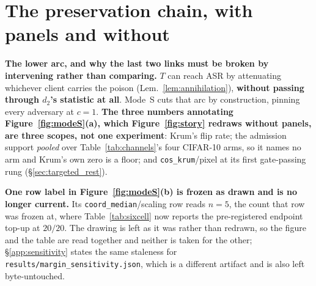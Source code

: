 \documentclass{article}
\begin{document}
\section{The preservation chain, with panels and without}
\label{app:story}

\textbf{The lower arc, and why the last two links must be broken by intervening rather than comparing.} $T$ can reach ASR by attenuating whichever client carries the poison (Lem.~\ref{lem:annihilation}), \textbf{without passing through $d_2$'s statistic at all}. Mode~S cuts that arc by construction, pinning every adversary at $c{=}1$. \textbf{The three numbers annotating Figure~\ref{fig:modeS}(a), which Figure~\ref{fig:story} redraws without panels, are three scopes, not one experiment}: Krum's flip rate; the admission support \emph{pooled} over Table~\ref{tab:channels}'s four CIFAR-10 arms, so it names no arm and Krum's own zero is a floor; and \texttt{cos\_krum}/pixel at its first gate-passing rung (§\ref{sec:targeted_rest}).

\noindent \textbf{One row label in Figure~\ref{fig:modeS}(b) is frozen as drawn and is no longer current.} Its \texttt{coord\_median}/scaling row reads $n{=}5$, the count that row was frozen at, where Table~\ref{tab:sixcell} now reports the pre-registered endpoint top-up at $20/20$. The drawing is left as it was rather than redrawn, so the figure and the table are read together and neither is taken for the other; §\ref{app:sensitivity} states the same staleness for \texttt{results/\allowbreak margin\_\allowbreak sensitivity.json}, which is a different artifact and is also left byte-untouched.
\end{document}
